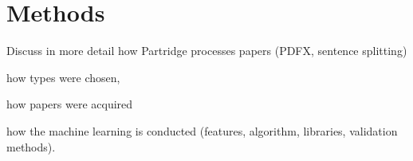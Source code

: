 \documentclass{svmult}
\begin{document}


\section{Methods}
\label{sec:2}

Discuss in more detail how Partridge processes papers (PDFX, sentence splitting) 

how types were chosen,

how papers were acquired 

how the machine learning is conducted (features, algorithm, libraries, validation methods).



%
%

\end{document}
